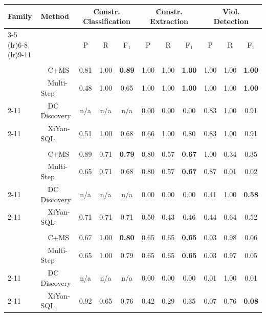 \begin{tabular}{llccccccccc}
\toprule
\textbf{Family} & \textbf{Method} & \multicolumn{3}{c}{Constr. Classification} & \multicolumn{3}{c}{Constr. Extraction} & \multicolumn{3}{c}{Viol. Detection} \\
\cmidrule(lr){3-5}  \cmidrule(lr){6-8}  \cmidrule(lr){9-11}
 &  & P & R & F$_1$ & P & R & F$_1$ & P & R & F$_1$ \\
\midrule
\addlinespace[2pt]
\multicolumn{11}{c}{\textbf{Hospital}} \\
\addlinespace[1pt]
\multirow{2}{*}{\system} & ~~C+MS & 0.81 & 1.00 & \textbf{0.89} & 1.00 & 1.00 & \textbf{1.00} & 1.00 & 1.00 & \textbf{1.00} \\
 & ~~Multi-Step & 0.48 & 1.00 & 0.65 & 1.00 & 1.00 & \textbf{1.00} & 1.00 & 1.00 & \textbf{1.00} \\
\cmidrule(l){2-11}
\multirow{1}{*}{Profiling} & ~~DC Discovery & n/a & n/a & n/a & 0.00 & 0.00 & 0.00 & 0.83 & 1.00 & 0.91 \\
\cmidrule(l){2-11}
\multirow{1}{*}{Text2SQL} & ~~XiYan-SQL & 0.51 & 1.00 & 0.68 & 0.66 & 1.00 & 0.80 & 0.83 & 1.00 & 0.91 \\
\midrule
\addlinespace[2pt]
\multicolumn{11}{c}{\textbf{Restaurant}} \\
\addlinespace[1pt]
\multirow{2}{*}{\system} & ~~C+MS & 0.89 & 0.71 & \textbf{0.79} & 0.80 & 0.57 & \textbf{0.67} & 1.00 & 0.34 & 0.35 \\
 & ~~Multi-Step & 0.65 & 0.71 & 0.68 & 0.80 & 0.57 & \textbf{0.67} & 0.87 & 0.01 & 0.02 \\
\cmidrule(l){2-11}
\multirow{1}{*}{Profiling} & ~~DC Discovery & n/a & n/a & n/a & 0.00 & 0.00 & 0.00 & 0.41 & 1.00 & \textbf{0.58} \\
\cmidrule(l){2-11}
\multirow{1}{*}{Text2SQL} & ~~XiYan-SQL & 0.71 & 0.71 & 0.71 & 0.50 & 0.43 & 0.46 & 0.44 & 0.64 & 0.52 \\
\midrule
\addlinespace[2pt]
\multicolumn{11}{c}{\textbf{SISU}} \\
\addlinespace[1pt]
\multirow{2}{*}{\system} & ~~C+MS & 0.67 & 1.00 & \textbf{0.80} & 0.65 & 0.65 & \textbf{0.65} & 0.03 & 0.98 & 0.06 \\
 & ~~Multi-Step & 0.65 & 1.00 & 0.79 & 0.65 & 0.65 & \textbf{0.65} & 0.03 & 0.97 & 0.05 \\
\cmidrule(l){2-11}
\multirow{1}{*}{Profiling} & ~~DC Discovery & n/a & n/a & n/a & 0.00 & 0.00 & 0.00 & 0.01 & 1.00 & 0.01 \\
\cmidrule(l){2-11}
\multirow{1}{*}{Text2SQL} & ~~XiYan-SQL & 0.92 & 0.65 & 0.76 & 0.42 & 0.29 & 0.35 & 0.07 & 0.76 & \textbf{0.08} \\

\end{tabular}
